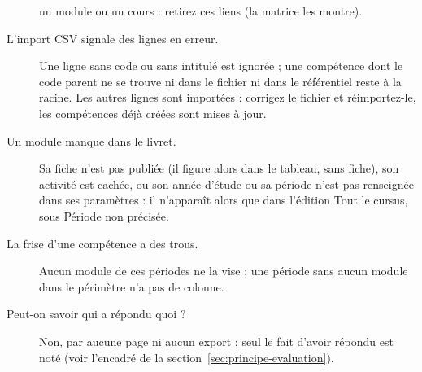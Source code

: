 \documentclass[11pt,a4paper]{article}
\begin{document}
\begin{description}
    un module ou un cours : retirez ces liens (la matrice les montre).
  \item[L'import CSV signale des lignes en erreur.] Une ligne sans code ou sans intitulé est
    ignorée ; une compétence dont le code parent ne se trouve ni dans le fichier ni dans le
    référentiel reste à la racine. Les autres lignes sont importées : corrigez le fichier et
    réimportez-le, les compétences déjà créées sont mises à jour.
  \item[Un module manque dans le livret.] Sa fiche n'est pas publiée (il figure alors dans le
    tableau, sans fiche), son activité est cachée, ou son année d'étude ou sa période n'est pas
    renseignée dans ses paramètres : il n'apparaît alors que dans l'édition \og Tout le
    cursus\fg{}, sous \og Période non précisée\fg{}.
  \item[La frise d'une compétence a des trous.] Aucun module de ces périodes ne la vise ; une
    période sans aucun module dans le périmètre n'a pas de colonne.
  \item[Peut-on savoir qui a répondu quoi ?] Non, par aucune page ni aucun export ; seul le fait
    d'avoir répondu est noté (voir l'encadré de la section~\ref{sec:principe-evaluation}).
\end{description}
\end{document}

